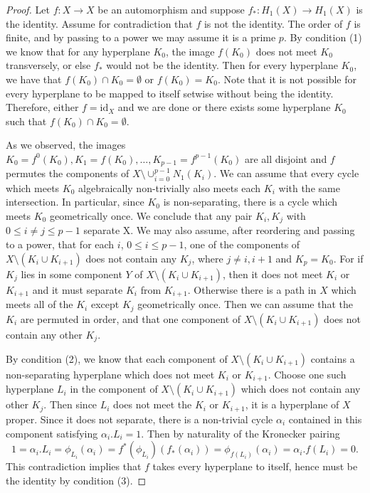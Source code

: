 \documentclass[11pt]{amsart}
\numberwithin{thm}{section}
\theoremstyle{remark}
\theoremstyle{definition}
\newcommand{\id}{\text{id}}
\begin{document}
\begin{proof}
Let $f:X\rightarrow X$ be an automorphism and suppose $f_*:H_1(X)\rightarrow H_1(X)$ is the identity.  Assume for contradiction that $f$ is not the identity. The order of $f$ is finite, and by passing to a power we may assume it is a prime $p$.  By condition (1) we know that for any hyperplane $K_0$, the image $f(K_0)$ does not meet $K_0$ transversely, or else $f_*$ would not be the identity. Then for every hyperplane $K_0$, we have that $f(K_0)\cap K_0=\emptyset$ or $f(K_0)=K_0$.  Note that it is not possible for every hyperplane to be mapped to itself setwise without being the identity.  Therefore, either $f=\id_X$ and we are done or there exists some hyperplane $K_0$ such that $f(K_0)\cap K_0=\emptyset$.

As we observed, the images $K_0=f^0(K_0),K_1=f(K_0),\ldots, K_{p-1}=f^{p-1}(K_0)$ are all disjoint and $f$ permutes the components of $X\setminus \cup_{i=0}^{p-1}N_1(K_i)$. We can assume that every cycle which meets $K_0$ algebraically non-trivially also meets each $K_i$ with the same intersection.  In particular, since $K_0$ is non-separating, there is a cycle which meets $K_0$ geometrically once. We conclude that any pair $K_i,K_j$ with $0\leq i\neq j\leq p-1$ separate X. We may also assume, after reordering and passing to a power, that for each $i$, $0\leq i\leq p-1$, one of the components of $X\setminus( K_i\cup K_{i+1})$ does not contain any $K_j$, where $j\neq i, i+1$ and $K_p=K_0$.  For if $K_j$ lies in some component $Y$ of $X\setminus( K_i\cup K_{i+1})$, then it does not meet $K_i$ or $K_{i+1}$ and it must separate $K_i$ from $K_{i+1}$.  Otherwise there is a path in $X$ which meets all of the $K_i$ except $K_j$ geometrically once.  Then we can assume that the $K_i$ are permuted in order, and that one component of $X\setminus( K_i\cup K_{i+1})$ does not contain any other $K_j$.  

By condition (2), we know that each component of $X\setminus( K_i\cup K_{i+1})$ contains a non-separating hyperplane which does not meet $K_i$ or $K_{i+1}$. Choose one such hyperplane $L_i$ in the component of $X\setminus( K_i\cup K_{i+1})$ which does not contain any other $K_j$.  Then since $L_i$ does not meet the $K_i$ or $K_{i+1}$, it is a hyperplane of $X$ proper.  Since it does not separate, there is a non-trivial cycle $\alpha_i$ contained in this component satisfying $\alpha_i.L_i=1$. Then by naturality of the Kronecker pairing \[1=\alpha_i.L_i=\phi_{L_i}(\alpha_i)=f^*(\phi_{L_i})(f_*(\alpha_i))=\phi_{f(L_i)}(\alpha_i)=\alpha_i.f(L_i)=0.\]  
This contradiction implies that $f$ takes every hyperplane to itself, hence must be the identity by condition (3). 
\end{proof}
\end{document}
